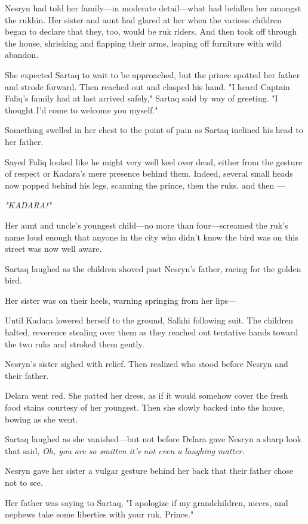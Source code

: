 Nesryn had told her family---in moderate detail---what had befallen her amongst the rukhin. Her sister and aunt had glared at her when the various children began to declare that they, too, would be ruk riders. And then took off through the house, shrieking and flapping their arms, leaping off furniture with wild abandon.

She expected Sartaq to wait to be approached, but the prince spotted her father and strode forward. Then reached out and clasped his hand. "I heard Captain Faliq's family had at last arrived safely," Sartaq said by way of greeting. "I thought I'd come to welcome you myself."

Something swelled in her chest to the point of pain as Sartaq inclined his head to her father.

Sayed Faliq looked like he might very well keel over dead, either from the gesture of respect or Kadara's mere presence behind them. Indeed, several small heads now popped behind his legs, scanning the prince, then the ruks, and then ---

\emph{"KADARA!"}

Her aunt and uncle's youngest child---no more than four---screamed the ruk's name loud enough that anyone in the city who didn't know the bird was on this street was now well aware.

Sartaq laughed as the children shoved past Nesryn's father, racing for the golden bird.

Her sister was on their heels, warning springing from her lips---

Until Kadara lowered herself to the ground, Salkhi following suit. The children halted, reverence stealing over them as they reached out tentative hands toward the two ruks and stroked them gently.

Nesryn's sister sighed with relief. Then realized who stood before Nesryn and their father.

Delara went red. She patted her dress, as if it would somehow cover the fresh food stains courtesy of her youngest. Then she slowly backed into the house, bowing as she went.

Sartaq laughed as she vanished---but not before Delara gave Nesryn a sharp look that said, \emph{Oh, you are so smitten it's not even a laughing matter.}

Nesryn gave her sister a vulgar gesture behind her back that their father chose not to see.

Her father was saying to Sartaq, "I apologize if my grandchildren, nieces, and nephews take some liberties with your ruk, Prince."

